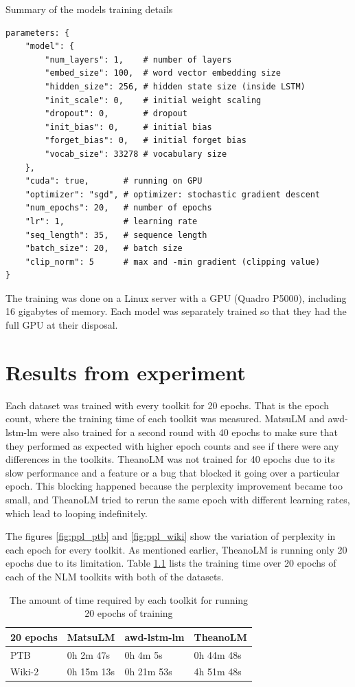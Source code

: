Summary of the models training details
\begin{lstlisting}
parameters: {    
    "model": {
        "num_layers": 1,    # number of layers
        "embed_size": 100,  # word vector embedding size
        "hidden_size": 256, # hidden state size (inside LSTM)
        "init_scale": 0,    # initial weight scaling
        "dropout": 0,       # dropout
        "init_bias": 0,     # initial bias
        "forget_bias": 0,   # initial forget bias
        "vocab_size": 33278 # vocabulary size
    },
    "cuda": true,       # running on GPU
    "optimizer": "sgd", # optimizer: stochastic gradient descent
    "num_epochs": 20,   # number of epochs
    "lr": 1,            # learning rate
    "seq_length": 35,   # sequence length
    "batch_size": 20,   # batch size
    "clip_norm": 5      # max and -min gradient (clipping value)
}
\end{lstlisting}

The training was done on a Linux server with a GPU (Quadro P5000), including 16 gigabytes of memory. Each model was separately trained so that they had the full GPU at their disposal. 

\chapter{Results from experiment}
\label{sec:Experiment}

Each dataset was trained with every toolkit for 20 epochs. That is the epoch count, where the training time of each toolkit was measured. MatsuLM and awd-lstm-lm were also trained for a second round with 40 epochs to make sure that they performed as expected with higher epoch counts and see if there were any differences in the toolkits. TheanoLM was not trained for 40 epochs due to its slow performance and a feature or a bug that blocked it going over a particular epoch. This blocking happened because the perplexity improvement became too small, and TheanoLM tried to rerun the same epoch with different learning rates, which lead to looping indefinitely.

The figures \ref{fig:ppl_ptb} and \ref{fig:ppl_wiki} show the variation of perplexity in each epoch for every toolkit. As mentioned earlier, TheanoLM is running only 20 epochs due to its limitation. Table \ref{tab:time} lists the training time over 20 epochs of each of the NLM toolkits with both of the datasets. 

\begin{table}[h]
\begin{tabular}{|l|l|l|l|}
\hline
\textbf{20 epochs} & MatsuLM  & awd-lstm-lm & TheanoLM   \\ \hline
PTB                & 0h 2m 47s   & 0h 4m 5s     & 0h 44m 48s    \\ \hline
Wiki-2             & 0h 15m 13s  & 0h 21m 53s   & 4h 51m 48s \\ \hline
\end{tabular}
\caption{The amount of time required by each toolkit for running 20 epochs of training}
\label{tab:time}
\end{table}
    

